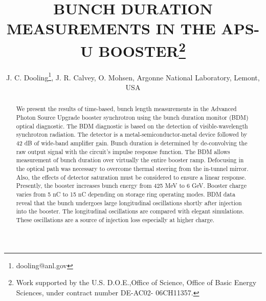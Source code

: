 \documentclass[a4paper,
               biblatex,     %
               ]{jacow}
\begin{document}
\title{BUNCH DURATION MEASUREMENTS IN THE APS-U BOOSTER\thanks{Work supported by the U.S. D.O.E.,Office of Science, Office of Basic Energy Sciences, under contract number DE-AC02- 06CH11357.}}

\author{J. C. Dooling\thanks{dooling@anl.gov}, J. R. Calvey, O. Mohsen, Argonne National Laboratory, Lemont, USA \\
}

	
\maketitle

%
\begin{abstract}

 We present the results of time-based, bunch length measurements in the Advanced Photon Source Upgrade booster synchrotron using the bunch duration monitor (BDM) optical diagnostic.  The BDM diagnostic is based on the detection of visible-wavelength synchrotron radiation.  The detector is a metal-semiconductor-metal device followed by 42 dB of wide-band amplifier gain.  Bunch duration is determined by de-convolving the raw output signal with the circuit’s impulse response function.  The BDM allows measurement of bunch duration over virtually the entire booster ramp.  Defocusing in the optical path was necessary to overcome thermal steering from the in-tunnel mirror.  Also, the effects of detector saturation must be considered to ensure a linear response. Presently, the booster increases bunch energy from 425 MeV to 6 GeV.  Booster charge varies from 5 nC to 15 nC depending on storage ring operating modes.  BDM data reveal that the bunch undergoes large longitudinal oscillations shortly after injection into the booster.  The longitudinal oscillations are compared with elegant simulations.  These oscillations are a source of injection loss especially at higher charge.
 
\end{abstract}
\end{document}
